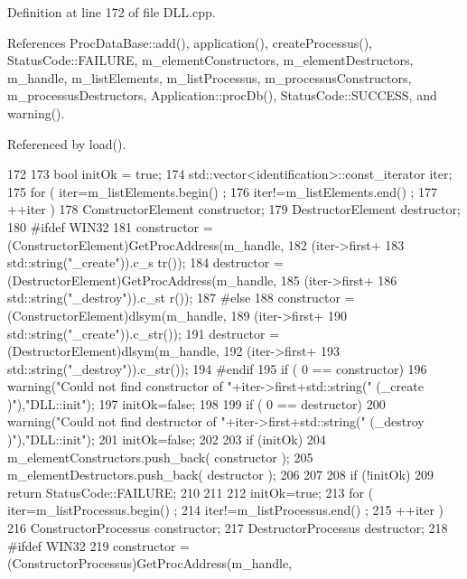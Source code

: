 Definition at line 172 of file DLL.cpp.

References ProcDataBase::add(), application(), createProcessus(), StatusCode::FAILURE, m\_\-elementConstructors, m\_\-elementDestructors, m\_\-handle, m\_\-listElements, m\_\-listProcessus, m\_\-processusConstructors, m\_\-processusDestructors, Application::procDb(), StatusCode::SUCCESS, and warning().

Referenced by load().


\begin{DoxyCode}
172                         {
173   bool initOk = true;
174   std::vector<identification>::const_iterator iter;
175   for ( iter=m_listElements.begin() ;
176         iter!=m_listElements.end() ;
177         ++iter ) {
178     ConstructorElement constructor;
179     DestructorElement destructor;
180 #ifdef WIN32
181     constructor = (ConstructorElement)GetProcAddress(m_handle,
182                                                      (iter->first+
183                                                       std::string("_create")).c_s
      tr());
184     destructor = (DestructorElement)GetProcAddress(m_handle,
185                                                    (iter->first+
186                                                     std::string("_destroy")).c_st
      r());
187 #else
188     constructor = (ConstructorElement)dlsym(m_handle,
189                                            (iter->first+
190                                            std::string("_create")).c_str());
191     destructor = (DestructorElement)dlsym(m_handle,
192                                          (iter->first+
193                                          std::string("_destroy")).c_str());
194 #endif
195     if ( 0 == constructor) {
196       warning("Could not find constructor of "+iter->first+std::string(" (_create
      )"),"DLL::init");
197       initOk=false;
198     }
199     if ( 0 == destructor) {
200       warning("Could not find destructor of "+iter->first+std::string(" (_destroy
      )"),"DLL::init");
201       initOk=false;
202     }
203     if (initOk) {
204       m_elementConstructors.push_back( constructor );
205       m_elementDestructors.push_back( destructor );
206     }
207   }
208   if (!initOk){
209     return StatusCode::FAILURE;
210   }
211 
212   initOk=true;
213   for ( iter=m_listProcessus.begin() ;
214         iter!=m_listProcessus.end() ;
215         ++iter ) {
216     ConstructorProcessus constructor;
217     DestructorProcessus destructor;
218 #ifdef WIN32
219     constructor = (ConstructorProcessus)GetProcAddress(m_handle,
}}
\end{DoxyCode}
